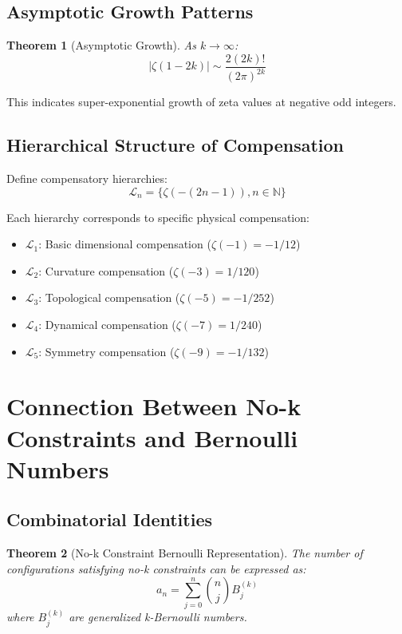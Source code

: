 \documentclass[12pt]{article}
\newtheorem{theorem}{Theorem}[section]
\begin{document}
\subsection{Asymptotic Growth Patterns}

\begin{theorem}[Asymptotic Growth]
As $k \to \infty$:
$$|\zeta(1-2k)| \sim \frac{2(2k)!}{(2\pi)^{2k}}$$
\end{theorem}

This indicates super-exponential growth of zeta values at negative odd integers.

\subsection{Hierarchical Structure of Compensation}

Define compensatory hierarchies:
$$\mathcal{L}_n = \{\zeta(-(2n-1)), n \in \mathbb{N}\}$$

Each hierarchy corresponds to specific physical compensation:
\begin{itemize}
\item $\mathcal{L}_1$: Basic dimensional compensation ($\zeta(-1) = -1/12$)
\item $\mathcal{L}_2$: Curvature compensation ($\zeta(-3) = 1/120$)
\item $\mathcal{L}_3$: Topological compensation ($\zeta(-5) = -1/252$)
\item $\mathcal{L}_4$: Dynamical compensation ($\zeta(-7) = 1/240$)
\item $\mathcal{L}_5$: Symmetry compensation ($\zeta(-9) = -1/132$)
\end{itemize}

\section{Connection Between No-k Constraints and Bernoulli Numbers}

\subsection{Combinatorial Identities}

\begin{theorem}[No-k Constraint Bernoulli Representation]
The number of configurations satisfying no-k constraints can be expressed as:
$$a_n = \sum_{j=0}^{n} \binom{n}{j} B_j^{(k)}$$
where $B_j^{(k)}$ are generalized k-Bernoulli numbers.
\end{theorem}
\end{document}
